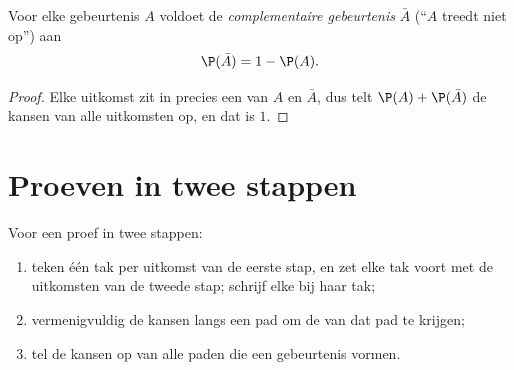 \begin{proposition}[Complement]\label{prop:g9:statproba:complement}
Voor elke gebeurtenis $A$ voldoet de \emph{complementaire gebeurtenis} $\bar A$
(``$A$ treedt niet op'') aan
\[
\P(\bar A) = 1 - \P(A).
\]
\end{proposition}

\begin{proof}
Elke uitkomst zit in precies een van $A$ en $\bar A$, dus telt
$\P(A) + \P(\bar A)$ de kansen van alle uitkomsten op, en dat is $1$.
\end{proof}

\section{Proeven in twee stappen}

\begin{method}[Boomdiagrammen]\label{met:g9:statproba:tree}
Voor een proef in twee stappen:
\begin{enumerate}
  \item teken één tak per uitkomst van de eerste stap, en zet elke tak voort met de
        uitkomsten van de tweede stap; schrijf elke  bij haar tak;
  \item vermenigvuldig de kansen langs een pad om de  van dat pad te krijgen;
  \item tel de kansen op van alle paden die een gebeurtenis vormen.
\end{enumerate}
\end{method}

